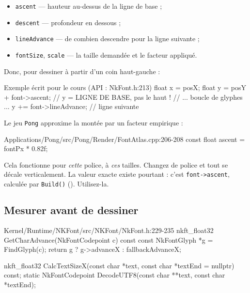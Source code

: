 \begin{itemize}
  \item \texttt{ascent} — hauteur au-dessus de la ligne de base ;
  \item \texttt{descent} — profondeur en dessous ;
  \item \texttt{lineAdvance} — de combien descendre pour la ligne suivante ;
  \item \texttt{fontSize}, \texttt{scale} — la taille demandée et le facteur
        appliqué.
\end{itemize}

Donc, pour dessiner à partir d'un coin haut-gauche :

\begin{nkcode}{Exemple écrit pour le cours (API : NkFont.h:213)}
float x = posX;
float y = posY + font->ascent;      // y = LIGNE DE BASE, pas le haut !
// ... boucle de glyphes ...
y += font->lineAdvance;             // ligne suivante
\end{nkcode}

\begin{nkpiege}
Le jeu \texttt{Pong} approxime la montée par un facteur empirique :

\begin{nkcode}{Applications/Pong/src/Pong/Render/FontAtlas.cpp:206-208}
            const float ascent = fontPx * 0.82f;
\end{nkcode}

Cela fonctionne pour \emph{cette} police, à \emph{ces} tailles. Changez de
police et tout se décale verticalement. La valeur exacte existe pourtant :
c'est \texttt{font->ascent}, calculée par \texttt{Build()}
(). Utilisez-la.
\end{nkpiege}

\subsection{Mesurer avant de dessiner}

\begin{nkcode}{Kernel/Runtime/NKFont/src/NKFont/NkFont.h:229-235}
            nkft_float32 GetCharAdvance(NkFontCodepoint c) const {
                const NkFontGlyph *g = FindGlyph(c);
                return g ? g->advanceX : fallbackAdvanceX;
            }

            nkft_float32 CalcTextSizeX(const char *text, const char *textEnd = nullptr) const;
            static NkFontCodepoint DecodeUTF8(const char **text, const char *textEnd);
\end{nkcode}

